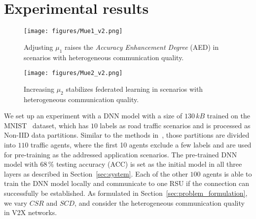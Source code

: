 \section{Experimental results}
\label{sec:evaluation}
\begin{figure*}[htb]
\texttt{[image: figures/Mue1\_v2.png]}
\caption{Adjusting $\mu_1$ raises the \emph{Accuracy Enhancement Degree} (AED) in scenarios with heterogeneous communication quality.}
\label{fig:Mue1}
\end{figure*}

\begin{figure*}[ht]
\texttt{[image: figures/Mue2\_v2.png]}
\caption{Increasing $\mu_2$ stabilizes federated learning in scenarios with heterogeneous communication quality.}
\label{fig:Mue2}
\vspace{-0.3cm}
\end{figure*}

We set up an experiment with a DNN model with a size of $130\,kB$ trained on the MNIST~\cite{726791} dataset, which has $10$ labels as road traffic scenarios and is processed as Non-IID data partitions. Similar to the methods in~\cite{caldas2019leaf}, those partitions are divided into $110$ traffic agents, where the first 10 agents exclude a few labels and are used for pre-training as the addressed application scenarios. The pre-trained DNN model with  $68\,\%$ testing accuracy (ACC) is set as the initial model in all three layers as described in Section~\ref{sec:system}. Each of the other $100$ agents is able to train the DNN model locally and communicate to one RSU if the connection can successfully be established. As formulated in Section~\ref{sec:problem_formulation}, we vary $CSR$ and $SCD$, and consider the heterogeneous communication quality in V2X networks.


